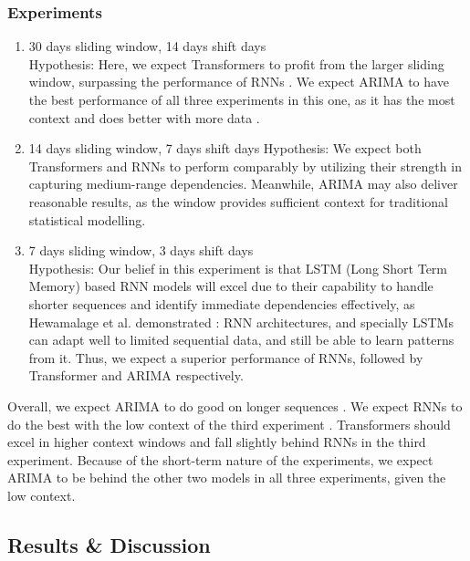 \documentclass[12pt, letterpaper]{article}
\begin{document}
\subsubsection*{Experiments}
    \begin{enumerate}
        \item 30 days sliding window, 14 days shift days\\
            Hypothesis: Here, we expect Transformers to profit from the larger sliding window, surpassing the performance of RNNs \cite{greff2017, sp500arimalstmregression}. We expect ARIMA to have the best performance of all three experiments in this one, as it has the most context and does better with more data \cite{ho2021}.
        \item 14 days sliding window, 7 days shift days
            Hypothesis: We expect both Transformers and RNNs to perform comparably by utilizing their strength in capturing medium-range dependencies. Meanwhile, ARIMA may also deliver reasonable results, as the window provides sufficient context for traditional statistical modelling.
        \item 7 days sliding window, 3 days shift days\\
            Hypothesis: Our belief in this experiment is that LSTM (Long Short Term Memory) based RNN models will excel due to their capability to handle shorter sequences and identify immediate dependencies effectively, as Hewamalage et al. demonstrated \cite{Hansika}: RNN architectures, and specially LSTMs can adapt well to limited sequential data, and still be able to learn patterns from it. Thus, we expect a superior performance of RNNs, followed by Transformer and ARIMA respectively.
    \end{enumerate}

    
Overall, we expect ARIMA to do good on longer sequences \cite{ho2021}. We expect RNNs to do the best with the low context of the third experiment \cite{Hansika}. Transformers should excel in higher context windows and fall slightly behind RNNs in the third experiment. Because of the short-term nature of the experiments, we expect ARIMA to be behind the other two models in all three experiments, given the low context.


\subsection*{Results \& Discussion}
\end{document}
